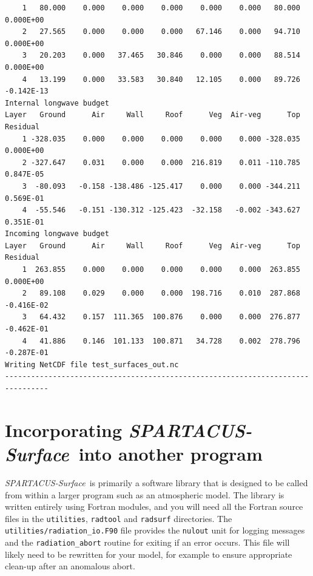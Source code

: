 \documentclass[a4,oneside]{article}
\def\codesize{\small}
\def\spsurf{\emph{SPARTACUS-Surface}}
\def\code#1{{\codesize\texttt{#1}}}
\begin{document}
\begin{verbatim}
    1   80.000    0.000    0.000    0.000    0.000    0.000   80.000  0.000E+00
    2   27.565    0.000    0.000    0.000   67.146    0.000   94.710  0.000E+00
    3   20.203    0.000   37.465   30.846    0.000    0.000   88.514  0.000E+00
    4   13.199    0.000   33.583   30.840   12.105    0.000   89.726 -0.142E-13
Internal longwave budget
Layer   Ground      Air     Wall     Roof      Veg  Air-veg      Top   Residual
    1 -328.035    0.000    0.000    0.000    0.000    0.000 -328.035  0.000E+00
    2 -327.647    0.031    0.000    0.000  216.819    0.011 -110.785  0.847E-05
    3  -80.093   -0.158 -138.486 -125.417    0.000    0.000 -344.211  0.569E-01
    4  -55.546   -0.151 -130.312 -125.423  -32.158   -0.002 -343.627  0.351E-01
Incoming longwave budget
Layer   Ground      Air     Wall     Roof      Veg  Air-veg      Top   Residual
    1  263.855    0.000    0.000    0.000    0.000    0.000  263.855  0.000E+00
    2   89.108    0.029    0.000    0.000  198.716    0.010  287.868 -0.416E-02
    3   64.432    0.157  111.365  100.876    0.000    0.000  276.877 -0.462E-01
    4   41.886    0.146  101.133  100.871   34.728    0.002  278.796 -0.287E-01
Writing NetCDF file test_surfaces_out.nc
--------------------------------------------------------------------------------

\end{verbatim}
\normalsize

\section{Incorporating \spsurf\ into another program}
\label{sec:api}
\spsurf\ is primarily a software library that is designed to be called
from within a larger program such as an atmospheric model.  The
library is written entirely using Fortran modules, and you will need
all the Fortran source files in the \code{utilities}, \code{radtool}
and \code{radsurf} directories.  The
\code{utilities/radiation\_io.F90} file provides the \code{nulout}
unit for logging messages and the \code{radiation\_abort} routine for
exiting if an error occurs.  This file will likely need to be
rewritten for your model, for example to ensure appropriate clean-up
after an anomalous abort.

\end{document}

